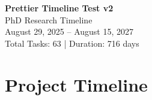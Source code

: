 \documentclass[portrait,a4paper]{article}
\begin{document}
\begin{center}
\vspace*{2cm}
{\Huge\bfseries Prettier Timeline Test v2}\\
\vspace{1cm}
{\Large PhD Research Timeline}\\
\vspace{0.5cm}
{\large August 29, 2025 -- August 15, 2027}\\
\vspace{1cm}
{\large Total Tasks: 63 | Duration: 716 days}
\end{center}

\vspace{2cm}

\section*{Project Timeline}
\vspace{0.5cm}
\end{document}
